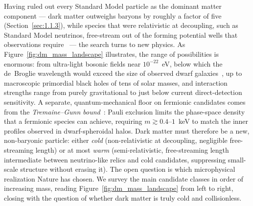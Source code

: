 Having ruled out every Standard Model particle as the dominant matter component --- dark matter outweighs baryons by roughly a factor of five (Section~\ref{sec:1.1.3}), while species that were relativistic at decoupling, such as Standard Model neutrinos, free-stream out of the forming potential wells that observations require~\cite{Bullock:2017xww} --- the search turns to new physics.
As Figure~\ref{fig:dm_mass_landscape} illustrates, the range of possibilities is enormous: 
from ultra-light bosonic fields near $10^{-22}$~eV, below which the de~Broglie wavelength would exceed the size of observed dwarf galaxies~\cite{Hu:2000ke}, up to macroscopic primordial black holes of tens of solar masses, and interaction strengths range from purely gravitational to just below current direct-detection sensitivity.
A separate, quantum-mechanical floor on fermionic candidates comes from the \emph{Tremaine--Gunn bound}~\cite{Tremaine:1979we,Boyarsky:2018tvu}: Pauli exclusion limits the phase-space density that a fermionic species can achieve, requiring $m \gtrsim 0.4$--$1$~keV to match the inner profiles observed in dwarf-spheroidal halos.
Dark matter must therefore be a new, non-baryonic particle: either \emph{cold} (non-relativistic at decoupling, negligible free-streaming length) or at most \emph{warm} (semi-relativistic, free-streaming length intermediate between neutrino-like relics and cold candidates, suppressing small-scale structure without erasing it).
The open question is which microphysical realization Nature has chosen.
We survey the main candidate classes in order of increasing mass, reading Figure~\ref{fig:dm_mass_landscape} from left to right, closing with the question of whether dark matter is truly cold and collisionless.

